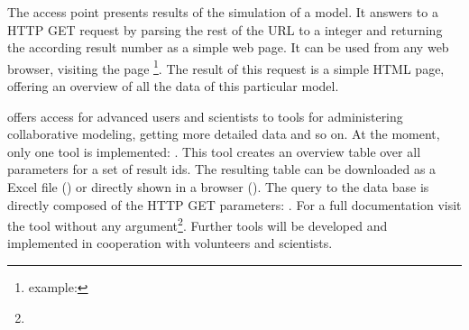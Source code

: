 The access point  presents results of the simulation of a model.
It answers to a HTTP GET request by parsing the rest of the URL to a integer and returning the according result number as a simple web page.
It can be used from any web browser, visiting the page \splurl[<result-id>]\footnote{example: \splurl[1337]}.
The result of this request is a simple HTML page, offering an overview of all the data of this particular model.

 offers access for advanced users and scientists to tools for administering collaborative modeling, getting more detailed data and so on.
At the moment, only one tool is implemented: .
This tool creates an overview table over all parameters for a set of result ids.
The resulting table can be downloaded as a Excel file () or directly shown in a browser ().
The query to the data base is directly composed of the HTTP GET parameters:
\splurl[tools/ResultDataTable?6696,6904-7000\&type=html].
For a full documentation visit the tool without any argument\footnote{}.
Further tools will be developed and implemented in cooperation with volunteers and scientists.




